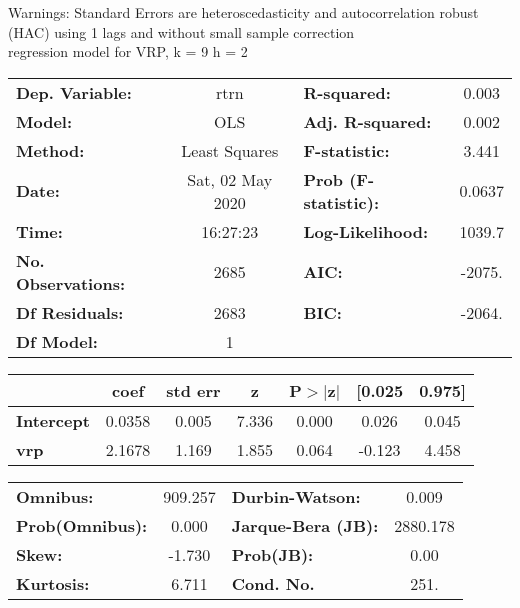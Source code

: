 Warnings: \newline
 [1] Standard Errors are heteroscedasticity and autocorrelation robust (HAC) using 1 lags and without small sample correction\\ 

regression model for VRP, k = 9 h = 2\begin{center}
\begin{tabular}{lclc}
\toprule
\textbf{Dep. Variable:}    &       rtrn       & \textbf{  R-squared:         } &     0.003   \\
\textbf{Model:}            &       OLS        & \textbf{  Adj. R-squared:    } &     0.002   \\
\textbf{Method:}           &  Least Squares   & \textbf{  F-statistic:       } &     3.441   \\
\textbf{Date:}             & Sat, 02 May 2020 & \textbf{  Prob (F-statistic):} &   0.0637    \\
\textbf{Time:}             &     16:27:23     & \textbf{  Log-Likelihood:    } &    1039.7   \\
\textbf{No. Observations:} &        2685      & \textbf{  AIC:               } &    -2075.   \\
\textbf{Df Residuals:}     &        2683      & \textbf{  BIC:               } &    -2064.   \\
\textbf{Df Model:}         &           1      & \textbf{                     } &             \\
\bottomrule
\end{tabular}
\begin{tabular}{lcccccc}
                   & \textbf{coef} & \textbf{std err} & \textbf{z} & \textbf{P$> |$z$|$} & \textbf{[0.025} & \textbf{0.975]}  \\
\midrule
\textbf{Intercept} &       0.0358  &        0.005     &     7.336  &         0.000        &        0.026    &        0.045     \\
\textbf{vrp}       &       2.1678  &        1.169     &     1.855  &         0.064        &       -0.123    &        4.458     \\
\bottomrule
\end{tabular}
\begin{tabular}{lclc}
\textbf{Omnibus:}       & 909.257 & \textbf{  Durbin-Watson:     } &    0.009  \\
\textbf{Prob(Omnibus):} &   0.000 & \textbf{  Jarque-Bera (JB):  } & 2880.178  \\
\textbf{Skew:}          &  -1.730 & \textbf{  Prob(JB):          } &     0.00  \\
\textbf{Kurtosis:}      &   6.711 & \textbf{  Cond. No.          } &     251.  \\
\bottomrule
\end{tabular}
\end{center}

